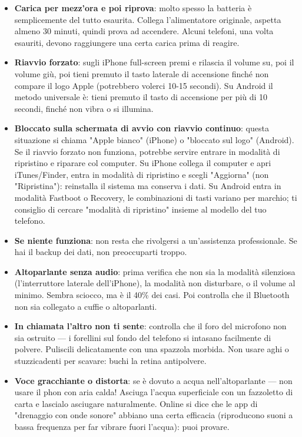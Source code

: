 \begin{itemize}
  \item \textbf{Carica per mezz'ora e poi riprova}: molto spesso la batteria è semplicemente del tutto esaurita. Collega l'alimentatore originale, aspetta almeno 30 minuti, quindi prova ad accendere. Alcuni telefoni, una volta esauriti, devono raggiungere una certa carica prima di reagire.
  \item \textbf{Riavvio forzato}: sugli iPhone full-screen premi e rilascia il volume su, poi il volume giù, poi tieni premuto il tasto laterale di accensione finché non compare il logo Apple (potrebbero volerci 10-15 secondi). Su Android il metodo universale è: tieni premuto il tasto di accensione per più di 10 secondi, finché non vibra o si illumina.
  \item \textbf{Bloccato sulla schermata di avvio con riavvio continuo}: questa situazione si chiama "Apple bianco" (iPhone) o "bloccato sul logo" (Android). Se il riavvio forzato non funziona, potrebbe servire entrare in modalità di ripristino e riparare col computer. Su iPhone collega il computer e apri iTunes/Finder, entra in modalità di ripristino e scegli "Aggiorna" (non "Ripristina"): reinstalla il sistema ma conserva i dati. Su Android entra in modalità Fastboot o Recovery, le combinazioni di tasti variano per marchio; ti consiglio di cercare "modalità di ripristino" insieme al modello del tuo telefono.
  \item \textbf{Se niente funziona}: non resta che rivolgersi a un'assistenza professionale. Se hai il backup dei dati, non preoccuparti troppo.
\end{itemize}


\begin{itemize}
  \item \textbf{Altoparlante senza audio}: prima verifica che non sia la modalità silenziosa (l'interruttore laterale dell'iPhone), la modalità non disturbare, o il volume al minimo. Sembra sciocco, ma è il 40\% dei casi. Poi controlla che il Bluetooth non sia collegato a cuffie o altoparlanti.
  \item \textbf{In chiamata l'altro non ti sente}: controlla che il foro del microfono non sia ostruito — i forellini sul fondo del telefono si intasano facilmente di polvere. Puliscili delicatamente con una spazzola morbida. Non usare aghi o stuzzicadenti per scavare: buchi la retina antipolvere.
  \item \textbf{Voce gracchiante o distorta}: se è dovuto a acqua nell'altoparlante — non usare il phon con aria calda! Asciuga l'acqua superficiale con un fazzoletto di carta e lascialo asciugare naturalmente. Online si dice che le app di "drenaggio con onde sonore" abbiano una certa efficacia (riproducono suoni a bassa frequenza per far vibrare fuori l'acqua): puoi provare.
\end{itemize}

